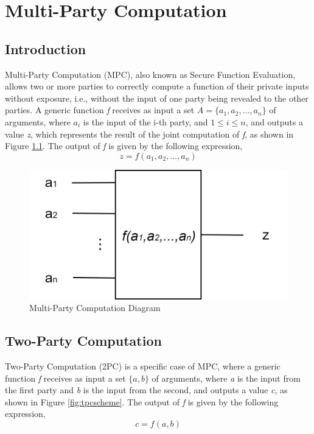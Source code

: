 \chapter{Multi-Party Computation}

\section{Introduction}
Multi-Party Computation (MPC), also known as Secure Function Evaluation, allows two or more parties
to correctly compute a function of their private inputs without exposure, i.e., without
the input of one party being revealed to the other parties.
A generic function \textit{f} receives as input a set $A = \{a_1,a_2,\dots,a_n\}$
of arguments, where $a_i$ is the input of the i-th party, and $1\leq i\leq n$, and outputs a value \textit{z}, which represents the result
of the joint computation of \textit{f}, as shown in Figure \ref{fig:mpcscheme}.
The output of \textit{f} is given by the following expression,
\begin{equation}\label{eq:mpc}
z = f(a_1,a_2,\dots,a_n)
\end{equation}

\renewcommand{\figurename}{Figure}
\begin{figure}[H]
\centering
\includegraphics[width=.45\linewidth]{./figures/mpc/mpc_scheme}
\caption{Multi-Party Computation Diagram}
\label{fig:mpcscheme}
\end{figure}
\pagebreak

\section{Two-Party Computation}
Two-Party Computation (2PC) is a specific case of MPC, where a generic function \textit{f} receives as input a set $\{a,b\}$
of arguments, where \textit{a} is the input from the first party and \textit{b} is the input from the second,
and outputs a value \textit{c}, as shown in Figure \ref{fig:tpcscheme}.
The output of \textit{f} is given by the following expression,
\begin{equation}\label{eq:tpc}
c = f(a,b)
\end{equation}

